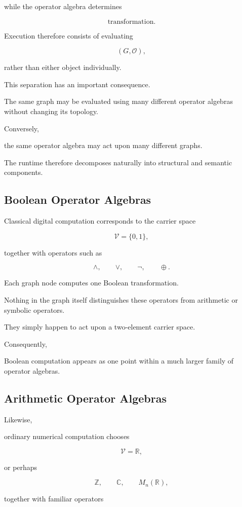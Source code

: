 \documentclass[12pt,oneside]{article}
\begin{document}
while the operator algebra determines

\[
\text{transformation}.
\]

Execution therefore consists of evaluating

\[
(G,\mathcal O),
\]

rather than either object individually.

This separation has an important consequence.

The same graph may be evaluated using many different operator algebras without changing its topology.

Conversely,

the same operator algebra may act upon many different graphs.

The runtime therefore decomposes naturally into structural and semantic components.

\subsection{Boolean Operator Algebras}

Classical digital computation corresponds to the carrier space

\[
\mathcal V
=
\{0,1\},
\]

together with operators such as

\[
\land,
\qquad
\lor,
\qquad
\neg,
\qquad
\oplus.
\]

Each graph node computes one Boolean transformation.

Nothing in the graph itself distinguishes these operators from arithmetic or symbolic operators.

They simply happen to act upon a two-element carrier space.

Consequently,

Boolean computation appears as one point within a much larger family of operator algebras.

\subsection{Arithmetic Operator Algebras}

Likewise,

ordinary numerical computation chooses

\[
\mathcal V
=
\mathbb R,
\]

or perhaps

\[
\mathbb Z,
\qquad
\mathbb C,
\qquad
M_n(\mathbb R),
\]

together with familiar operators
\end{document}
